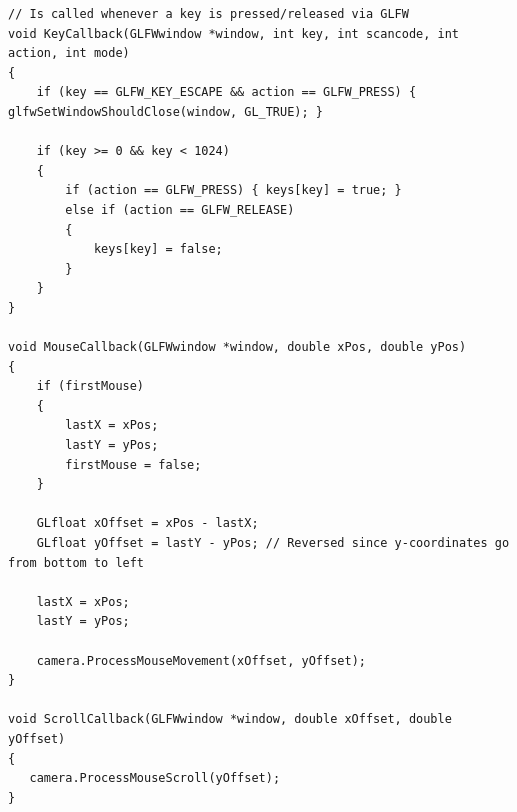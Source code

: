 \documentclass[12pt]{article}
\begin{document}
\begin{verbatim}
// Is called whenever a key is pressed/released via GLFW
void KeyCallback(GLFWwindow *window, int key, int scancode, int action, int mode)
{
    if (key == GLFW_KEY_ESCAPE && action == GLFW_PRESS) { glfwSetWindowShouldClose(window, GL_TRUE); }

    if (key >= 0 && key < 1024)
    {
        if (action == GLFW_PRESS) { keys[key] = true; }
        else if (action == GLFW_RELEASE)
        {
            keys[key] = false;
        }
    }
}

void MouseCallback(GLFWwindow *window, double xPos, double yPos)
{
    if (firstMouse)
    {
        lastX = xPos;
        lastY = yPos;
        firstMouse = false;
    }

    GLfloat xOffset = xPos - lastX;
    GLfloat yOffset = lastY - yPos; // Reversed since y-coordinates go from bottom to left

    lastX = xPos;
    lastY = yPos;

    camera.ProcessMouseMovement(xOffset, yOffset);
}

void ScrollCallback(GLFWwindow *window, double xOffset, double yOffset) 
{
   camera.ProcessMouseScroll(yOffset);
}
  \end{verbatim}

  \newpage
  
\end{document}
